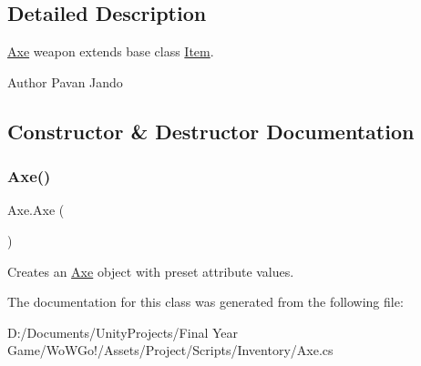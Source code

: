 \subsection{Detailed Description}
\mbox{\hyperlink{class_axe}{Axe}} weapon extends base class \mbox{\hyperlink{class_item}{Item}}. 

\begin{DoxyAuthor}{Author}
Pavan Jando
\end{DoxyAuthor}


\subsection{Constructor \& Destructor Documentation}
\mbox{\label{class_axe_aed1d9071bca40ee8d7ecf73245a7f692}} 
\subsubsection{\texorpdfstring{Axe()}{Axe()}}
{\footnotesize\ttfamily Axe.\+Axe (\begin{DoxyParamCaption}{ }\end{DoxyParamCaption})}



Creates an \mbox{\hyperlink{class_axe}{Axe}} object with preset attribute values. 



The documentation for this class was generated from the following file\+:\begin{DoxyCompactItemize}
\item 
D\+:/\+Documents/\+Unity\+Projects/\+Final Year Game/\+Wo\+W\+Go!/\+Assets/\+Project/\+Scripts/\+Inventory/Axe.\+cs\end{DoxyCompactItemize}
